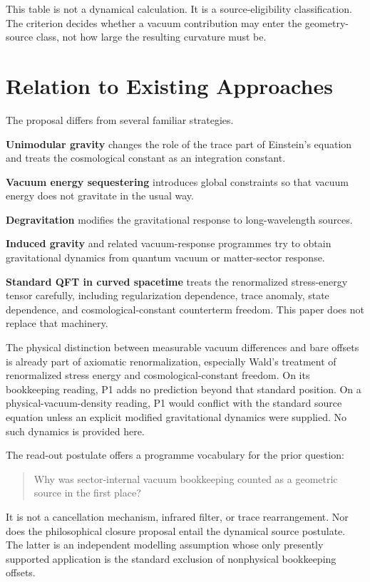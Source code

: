 \documentclass[12pt,a4paper]{article}
\theoremstyle{definition}
\theoremstyle{remark}
\begin{document}
This table is not a dynamical calculation. It is a source-eligibility classification. The criterion decides whether a vacuum contribution may enter the geometry-source class, not how large the resulting curvature must be.

\section{Relation to Existing Approaches}
\label{sec:relation}

The proposal differs from several familiar strategies.

\textbf{Unimodular gravity} changes the role of the trace part of Einstein's equation and treats the cosmological constant as an integration constant.

\textbf{Vacuum energy sequestering} introduces global constraints so that vacuum energy does not gravitate in the usual way.

\textbf{Degravitation} modifies the gravitational response to long-wavelength sources.

\textbf{Induced gravity} and related vacuum-response programmes try to obtain gravitational dynamics from quantum vacuum or matter-sector response.

\textbf{Standard QFT in curved spacetime} treats the renormalized stress-energy tensor carefully, including regularization dependence, trace anomaly, state dependence, and cosmological-constant counterterm freedom. This paper does not replace that machinery.

The physical distinction between measurable vacuum differences and bare offsets is already part of axiomatic renormalization, especially Wald's treatment of renormalized stress energy and cosmological-constant freedom.  On its bookkeeping reading, P1 adds no prediction beyond that standard position.  On a physical-vacuum-density reading, P1 would conflict with the standard source equation unless an explicit modified gravitational dynamics were supplied.  No such dynamics is provided here.

The read-out postulate offers a programme vocabulary for the prior question:

\begin{quote}
Why was sector-internal vacuum bookkeeping counted as a geometric source in the first place?
\end{quote}

It is not a cancellation mechanism, infrared filter, or trace rearrangement.  Nor does the philosophical closure proposal entail the dynamical source postulate.  The latter is an independent modelling assumption whose only presently supported application is the standard exclusion of nonphysical bookkeeping offsets.
\end{document}
